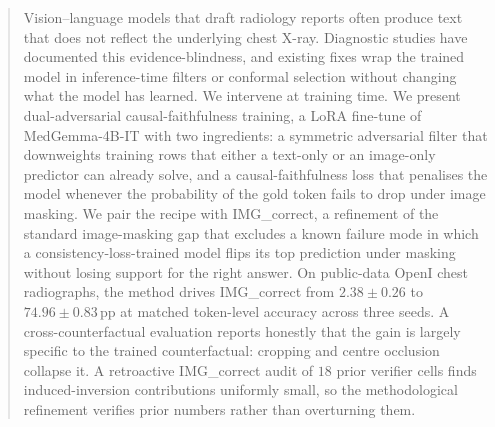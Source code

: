 \documentclass{article}
\begin{document}

\printAffiliationsAndNotice{}

\begin{abstract}
Vision--language models that draft radiology reports often produce
text that does not reflect the underlying chest X-ray. Diagnostic
studies have documented this evidence-blindness, and existing fixes
wrap the trained model in inference-time filters or conformal
selection without changing what the model has learned. We intervene
at training time. We present dual-adversarial causal-faithfulness
training, a LoRA fine-tune of MedGemma-4B-IT with two ingredients:
a symmetric adversarial filter that downweights training rows that
either a text-only or an image-only predictor can already solve, and
a causal-faithfulness loss that penalises the model whenever the
probability of the gold token fails to drop under image masking. We
pair the recipe with IMG\_correct, a refinement of the standard
image-masking gap that excludes a known failure mode in which a
consistency-loss-trained model flips its top prediction under masking
without losing support for the right answer. On public-data OpenI
chest radiographs, the method drives IMG\_correct from $2.38\pm0.26$
to $74.96\pm0.83$\,pp at matched token-level accuracy across three
seeds. A cross-counterfactual evaluation reports honestly that the
gain is largely specific to the trained counterfactual: cropping and
centre occlusion collapse it. A retroactive IMG\_correct audit of
$18$ prior verifier cells finds induced-inversion contributions
uniformly small, so the methodological refinement verifies prior
numbers rather than overturning them.
\end{abstract}
\end{document}
